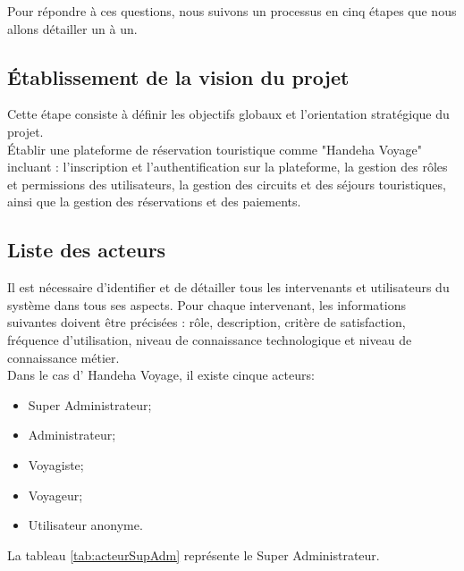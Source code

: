 \documentclass[12pt]{report}
\begin{document}
				Pour répondre à ces questions, nous suivons un processus en cinq étapes que nous allons détailler un à un.

				\subsection{Établissement de la vision du projet}

				\hspace{15pt} Cette étape consiste à définir les objectifs globaux et l'orientation stratégique du projet.\\

				Établir une plateforme de réservation touristique comme "Handeha Voyage" incluant : l'inscription et l'authentification sur la plateforme, la gestion des rôles et permissions des utilisateurs, la gestion des circuits et des séjours touristiques, ainsi que la gestion des réservations et des paiements.

				\subsection{Liste des acteurs}

				\hspace{15pt} Il est nécessaire d'identifier et de détailler tous les intervenants et utilisateurs du système dans tous ses aspects. Pour chaque intervenant, les informations suivantes doivent être précisées : rôle, description, critère de satisfaction, fréquence d’utilisation, niveau de connaissance technologique et niveau de connaissance métier.\\

				Dans le cas d' Handeha Voyage, il existe cinque acteurs:

				\begin{itemize}
					\item Super Administrateur;
					\item Administrateur;
					\item Voyagiste;
					\item Voyageur;
					\item Utilisateur anonyme.
				\end{itemize}

				La tableau \ref{tab:acteurSupAdm} représente le Super Administrateur.
\end{document}
